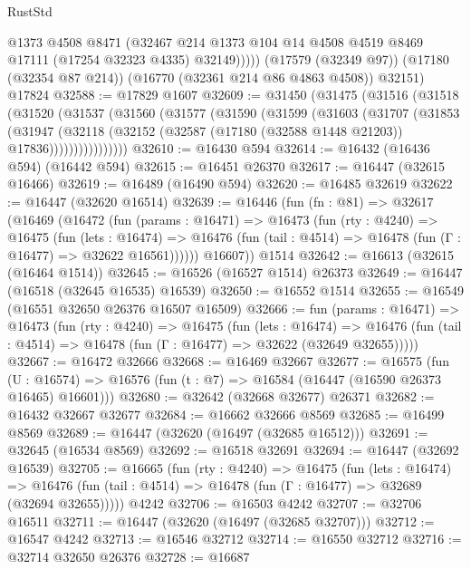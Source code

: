 \begin{lexlean}{RustStd}
\begin{coremodule}
              @1373
              @4508
              @8471
              (@32467 @214 @1373 @104 @14 @4508 @4519 @8469 @17111 (@17254 @32323 @4335) @32149)))))
      (@17579 (@32349 @97))
      (@17180 (@32354 @87 @214))
      (@16770 (@32361 @214 @86 @4863 @4508))
      @32151)
    @17824
@32588 := @17829 @1607
@32609 := @31450
    (@31475
      (@31516
        (@31518
          (@31520
            (@31537
              (@31560
                (@31577
                  (@31590
                    (@31599
                      (@31603
                        (@31707
                          (@31853
                            (@31947
                              (@32118
                                (@32152
                                  (@32587 (@17180 (@32588 @1448 @21203)) @17836))))))))))))))))
@32610 := @16430 @594
@32614 := @16432 (@16436 @594) (@16442 @594)
@32615 := @16451 @26370
@32617 := @16447 (@32615 @16466)
@32619 := @16489 (@16490 @594)
@32620 := @16485 @32619
@32622 := @16447 (@32620 @16514)
@32639 := @16446
    (fun (fn : @81) =>
    @32617
      (@16469
        (@16472
          (fun (params : @16471) =>
          @16473
            (fun (rty : @4240) =>
            @16475
              (fun (lets : @16474) =>
              @16476 (fun (tail : @4514) => @16478 (fun (Γ : @16477) => @32622 @16561))))))
        @16607))
    @1514
@32642 := @16613 (@32615 (@16464 @1514))
@32645 := @16526 (@16527 @1514) @26373
@32649 := @16447 (@16518 (@32645 @16535) @16539)
@32650 := @16552 @1514
@32655 := @16549 (@16551 @32650 @26376 @16507 @16509)
@32666 := fun (params : @16471) =>
  @16473
    (fun (rty : @4240) =>
    @16475
      (fun (lets : @16474) =>
      @16476 (fun (tail : @4514) => @16478 (fun (Γ : @16477) => @32622 (@32649 @32655)))))
@32667 := @16472 @32666
@32668 := @16469 @32667
@32677 := @16575
    (fun (U : @16574) => @16576 (fun (t : @7) => @16584 (@16447 (@16590 @26373 @16465) @16601)))
@32680 := @32642 (@32668 @32677) @26371
@32682 := @16432 @32667 @32677
@32684 := @16662 @32666 @8569
@32685 := @16499 @8569
@32689 := @16447 (@32620 (@16497 (@32685 @16512)))
@32691 := @32645 (@16534 @8569)
@32692 := @16518 @32691
@32694 := @16447 (@32692 @16539)
@32705 := @16665
    (fun (rty : @4240) =>
    @16475
      (fun (lets : @16474) =>
      @16476 (fun (tail : @4514) => @16478 (fun (Γ : @16477) => @32689 (@32694 @32655)))))
    @4242
@32706 := @16503 @4242
@32707 := @32706 @16511
@32711 := @16447 (@32620 (@16497 (@32685 @32707)))
@32712 := @16547 @4242
@32713 := @16546 @32712
@32714 := @16550 @32712
@32716 := @32714 @32650 @26376
@32728 := @16687

\end{coremodule}
\end{lexlean}
